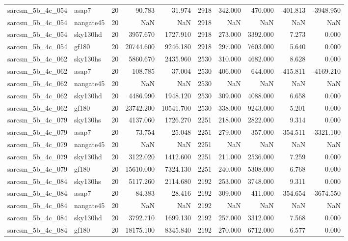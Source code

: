 \documentclass{article}
\begin{document}
\begin{longtable}{llrrrrrrrr}
sarcsm\_5b\_4c\_054 & asap7 & 20 & 90.783 & 31.974 & 2918 & 342.000 & 470.000 & -401.813 & -3948.950 \\
sarcsm\_5b\_4c\_054 & nangate45 & 20 & NaN & NaN & 2918 & NaN & NaN & NaN & NaN \\
sarcsm\_5b\_4c\_054 & sky130hd & 20 & 3957.670 & 1727.910 & 2918 & 273.000 & 3392.000 & 7.273 & 0.000 \\
sarcsm\_5b\_4c\_054 & gf180 & 20 & 20744.600 & 9246.180 & 2918 & 297.000 & 7603.000 & 5.640 & 0.000 \\
sarcsm\_5b\_4c\_062 & sky130hs & 20 & 5860.670 & 2435.960 & 2530 & 310.000 & 4682.000 & 8.628 & 0.000 \\
sarcsm\_5b\_4c\_062 & asap7 & 20 & 108.785 & 37.004 & 2530 & 406.000 & 644.000 & -415.811 & -4169.210 \\
sarcsm\_5b\_4c\_062 & nangate45 & 20 & NaN & NaN & 2530 & NaN & NaN & NaN & NaN \\
sarcsm\_5b\_4c\_062 & sky130hd & 20 & 4486.990 & 1948.120 & 2530 & 309.000 & 4088.000 & 6.658 & 0.000 \\
sarcsm\_5b\_4c\_062 & gf180 & 20 & 23742.200 & 10541.700 & 2530 & 338.000 & 9243.000 & 5.201 & 0.000 \\
sarcsm\_5b\_4c\_079 & sky130hs & 20 & 4137.060 & 1726.270 & 2251 & 218.000 & 2822.000 & 9.314 & 0.000 \\
sarcsm\_5b\_4c\_079 & asap7 & 20 & 73.754 & 25.048 & 2251 & 279.000 & 357.000 & -354.511 & -3321.100 \\
sarcsm\_5b\_4c\_079 & nangate45 & 20 & NaN & NaN & 2251 & NaN & NaN & NaN & NaN \\
sarcsm\_5b\_4c\_079 & sky130hd & 20 & 3122.020 & 1412.600 & 2251 & 211.000 & 2536.000 & 7.259 & 0.000 \\
sarcsm\_5b\_4c\_079 & gf180 & 20 & 15610.000 & 7324.130 & 2251 & 240.000 & 5308.000 & 6.768 & 0.000 \\
sarcsm\_5b\_4c\_084 & sky130hs & 20 & 5117.260 & 2114.680 & 2192 & 253.000 & 3748.000 & 9.311 & 0.000 \\
sarcsm\_5b\_4c\_084 & asap7 & 20 & 84.383 & 28.416 & 2192 & 309.000 & 411.000 & -354.654 & -3674.550 \\
sarcsm\_5b\_4c\_084 & nangate45 & 20 & NaN & NaN & 2192 & NaN & NaN & NaN & NaN \\
sarcsm\_5b\_4c\_084 & sky130hd & 20 & 3792.710 & 1699.130 & 2192 & 257.000 & 3312.000 & 7.568 & 0.000 \\
sarcsm\_5b\_4c\_084 & gf180 & 20 & 18175.100 & 8345.840 & 2192 & 270.000 & 6712.000 & 6.577 & 0.000 \\

\end{longtable}
\end{document}
